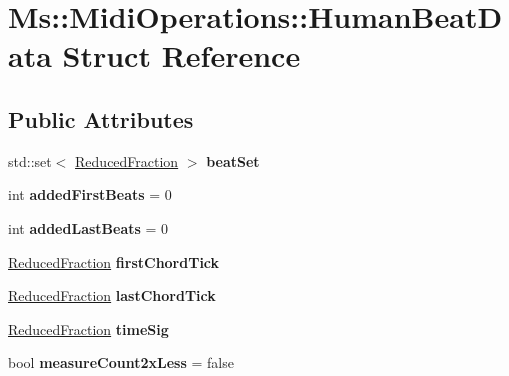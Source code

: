 \hypertarget{struct_ms_1_1_midi_operations_1_1_human_beat_data}{}\section{Ms\+:\+:Midi\+Operations\+:\+:Human\+Beat\+Data Struct Reference}
\label{struct_ms_1_1_midi_operations_1_1_human_beat_data}
\subsection*{Public Attributes}
\begin{DoxyCompactItemize}
\item 
\mbox{\label{struct_ms_1_1_midi_operations_1_1_human_beat_data_a6d12e73609831919029cff1485998e3d}} 
std\+::set$<$ \hyperlink{class_ms_1_1_reduced_fraction}{Reduced\+Fraction} $>$ {\bfseries beat\+Set}
\item 
\mbox{\label{struct_ms_1_1_midi_operations_1_1_human_beat_data_aa660b4c08c4e9acc51b5c7ccc7140c24}} 
int {\bfseries added\+First\+Beats} = 0
\item 
\mbox{\label{struct_ms_1_1_midi_operations_1_1_human_beat_data_ab60311dcfab6db12ab7749690490cbe8}} 
int {\bfseries added\+Last\+Beats} = 0
\item 
\mbox{\label{struct_ms_1_1_midi_operations_1_1_human_beat_data_a4c4965fb25b3c463b7f13615f8e61b1a}} 
\hyperlink{class_ms_1_1_reduced_fraction}{Reduced\+Fraction} {\bfseries first\+Chord\+Tick}
\item 
\mbox{\label{struct_ms_1_1_midi_operations_1_1_human_beat_data_aafd6cb8071f0309460c39f1df58abf38}} 
\hyperlink{class_ms_1_1_reduced_fraction}{Reduced\+Fraction} {\bfseries last\+Chord\+Tick}
\item 
\mbox{\label{struct_ms_1_1_midi_operations_1_1_human_beat_data_a00ef4816a83ecb5e5a4431af49f0449a}} 
\hyperlink{class_ms_1_1_reduced_fraction}{Reduced\+Fraction} {\bfseries time\+Sig}
\item 
\mbox{\label{struct_ms_1_1_midi_operations_1_1_human_beat_data_aad791b4b87bb2aedb8540ea782b4ebff}} 
bool {\bfseries measure\+Count2x\+Less} = false
\end{DoxyCompactItemize}


